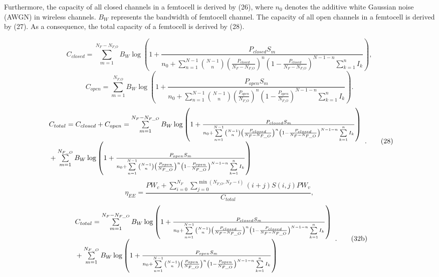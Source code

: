 \documentclass[10pt,final,journal,letterpaper,twoside,twocolumn]{IEEEtran}
\begin{document}
Furthermore, the capacity of all closed channels in a femtocell is derived by (26),
where ${n_0}$ denotes the additive white Gaussian noise (AWGN) in wireless
channels. ${B_W}$ represents the bandwidth of femtocell channel. The capacity
of all open channels in a femtocell is derived by (27).
As a consequence, the total capacity of a femtocell is derived by (28).
\begin{figure*}[!t]
\[{C_{closed}} = \sum\limits_{m = 1}^{{N_F} - {N_{F\_O}}} {{B_W}\log \left( {1 + \frac{{{P_{closed}}{S_m}}}{{{n_0} + \sum\limits_{n = 1}^{N - 1} {\binom{N - 1}{n}{{\left( {\frac{{{P_{closed}}}}{{{N_F} - {N_{F\_O}}}}} \right)}^n}{{\left( {1 - \frac{{{P_{closed}}}}{{{N_F} - {N_{F\_O}}}}} \right)}^{N - 1 - n}}\sum\limits_{k = 1}^n {{I_k}} } }}} \right)} ,\tag{26} \]
\[{C_{open}} = \sum\limits_{m = 1}^{{N_{F\_O}}} {{B_W}\log \left( {1 + \frac{{{P_{open}}{S_m}}}{{{n_0} + \sum\limits_{n = 1}^{N - 1} {\binom{N - 1}{n}{{\left( {\frac{{{P_{open}}}}{{{N_{F\_O}}}}} \right)}^n}{{\left( {1 - \frac{{{P_{open}}}}{{{N_{F\_O}}}}} \right)}^{N - 1 - n}}\sum\limits_{k = 1}^n {{I_k}} } }}} \right)}.\tag{27}\]
\[\begin{array}{l}{C_{total}} = {C_{closed}} + {C_{open}}= \sum\limits_{m = 1}^{{N_F} - {N_{F\_O}}} {{B_W}\log \left( {1 + \frac{{{P_{closed}}{S_m}}}{{{n_0} + \sum\limits_{n = 1}^{N - 1} {\binom{N - 1}{n}{{\left( {\frac{{{P_{closed}}}}{{{N_F} - {N_{F\_O}}}}} \right)}^n}{{\left( {1 - \frac{{{P_{closed}}}}{{{N_F} - {N_{F\_O}}}}} \right)}^{N - 1 - n}}\sum\limits_{k = 1}^n {{I_k}} } }}} \right)} \\{\rm{        }} + \sum\limits_{m = 1}^{{N_{F\_O}}} {{B_W}\log \left( {1 + \frac{{{P_{open}}{S_m}}}{{{n_0} + \sum\limits_{n = 1}^{N - 1} {\binom{N - 1}{n}{{\left( {\frac{{{P_{open}}}}{{{N_{F\_O}}}}} \right)}^n}{{\left( {1 - \frac{{{P_{open}}}}{{{N_{F\_O}}}}} \right)}^{N - 1 - n}}\sum\limits_{k = 1}^n {{I_k}} } }}} \right)} \end{array}. \tag{28}\]
\[{\eta _{EE}} = \frac{{P{W_c} + \sum\limits_{i = 0}^{{N_F}} {\sum\limits_{j = 0}^{\min \left( {{N_{F\_O}},{N_F} - i} \right)} {(i + j)S(i,j)} } P{W_v}}}{{{C_{total}}}},\tag{32a}\]
\[\begin{array}{l}{C_{total}} = \sum\limits_{m = 1}^{{N_F} - {N_{F\_O}}} {{B_W}\log \left( {1 + \frac{{{P_{closed}}{S_m}}}{{{n_0} + \sum\limits_{n = 1}^{N - 1} {\binom{N - 1}{n}{{\left( {\frac{{{P_{closed}}}}{{{N_F} - {N_{F\_O}}}}} \right)}^n}{{\left( {1 - \frac{{{P_{closed}}}}{{{N_F} - {N_{F\_O}}}}} \right)}^{N - 1 - n}}\sum\limits_{k = 1}^n {{I_k}} } }}} \right)} \\{\rm{               }} + \sum\limits_{m = 1}^{{N_{F\_O}}} {{B_W}\log \left( {1 + \frac{{{P_{open}}{S_m}}}{{{n_0} + \sum\limits_{n = 1}^{N - 1} {\binom{N - 1}{n}{{\left( {\frac{{{P_{open}}}}{{{N_{F\_O}}}}} \right)}^n}{{\left( {1 - \frac{{{P_{open}}}}{{{N_{F\_O}}}}} \right)}^{N - 1 - n}}\sum\limits_{k = 1}^n {{I_k}} } }}} \right)} \end{array}. \tag{32b}\]
\end{figure*}
\end{document}
